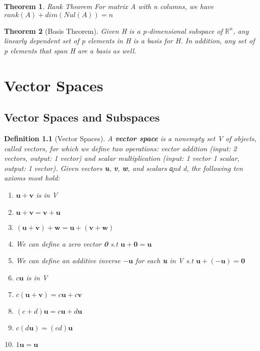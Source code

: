\documentclass[12pt]{report}
\newtheorem{thm}{Theorem}
\newtheorem{dfn}{Definition}
\begin{document}
\begin{thm}{Rank Theorem}
For matrix A with n columns, we have $rank(A)+dim(Nul(A))=n$
\end{thm}

\begin{thm}[Basis Theorem]
Given H is a p-dimensional subspace of $\mathbb{R}^n$, any linearly dependent set of p elements in H is a basis for H. In addition, any set of p elements that span H are a basis as well.
\end{thm}

\chapter{Vector Spaces}

\section{Vector Spaces and Subspaces}

\begin{dfn}[Vector Spaces]

A \textbf{vector space} is a nonempty set V of objects, called vectors, for which we define two operations: vector addition (input: 2 vectors, output: 1 vector) and scalar multiplication (input: 1 vector 1 scalar, output: 1 vector). Given vectors \textbf{u}, \textbf{v}, \textbf{w}, and scalars \c and d, the following ten axioms most hold:

\begin{enumerate}
\item[Closed under vector addition] $\bm{u}+\bm{v}$ is in V
\item $\bm{u}+\bm{v}=\bm{v}+\bm{u}$
\item $(\bm{u}+\bm{v})+\bm{w}=\bm{u}+(\bm{v}+\bm{w})$
\item We can define a zero vector \textbf{0} s.t $\bm{u}+\bm{0}=\bm{u}$
\item We can define an additive inverse $-\bm{u}$ for each \textbf{u} in V s.t $\bm{u}+(-\bm{u})=\bm{0}$
\item[Closed under scalar multiplication] $c\bm{u}$ is in V
\item $c(\bm{u}+\bm{v})=c\bm{u}+c\bm{v}$
\item $(c+d)\bm{u}=c\bm{u}+d\bm{u}$
\item $c(d\bm{u})=(cd)\bm{u}$
\item $1\bm{u}=\bm{u}$

\end{enumerate}
\end{dfn}
\end{document}
